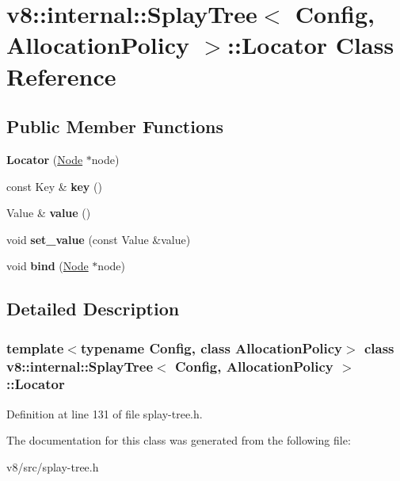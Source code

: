 \hypertarget{classv8_1_1internal_1_1SplayTree_1_1Locator}{}\section{v8\+:\+:internal\+:\+:Splay\+Tree$<$ Config, Allocation\+Policy $>$\+:\+:Locator Class Reference}
\label{classv8_1_1internal_1_1SplayTree_1_1Locator}
\subsection*{Public Member Functions}
\begin{DoxyCompactItemize}
\item 
\mbox{\label{classv8_1_1internal_1_1SplayTree_1_1Locator_aa7837aefae2009d7ce2dad2e1b3f0a85}} 
{\bfseries Locator} (\mbox{\hyperlink{classv8_1_1internal_1_1SplayTree_1_1Node}{Node}} $\ast$node)
\item 
\mbox{\label{classv8_1_1internal_1_1SplayTree_1_1Locator_a10b59ee20577e927c5c21c2a71bb390b}} 
const Key \& {\bfseries key} ()
\item 
\mbox{\label{classv8_1_1internal_1_1SplayTree_1_1Locator_aae7969e5d6e2255633dd892ffba2b1b3}} 
Value \& {\bfseries value} ()
\item 
\mbox{\label{classv8_1_1internal_1_1SplayTree_1_1Locator_a1714f075393a0fc1d5820f59556d744e}} 
void {\bfseries set\+\_\+value} (const Value \&value)
\item 
\mbox{\label{classv8_1_1internal_1_1SplayTree_1_1Locator_a93ead22bb615a5c24d6fd8c8bc9afd29}} 
void {\bfseries bind} (\mbox{\hyperlink{classv8_1_1internal_1_1SplayTree_1_1Node}{Node}} $\ast$node)
\end{DoxyCompactItemize}


\subsection{Detailed Description}
\subsubsection*{template$<$typename Config, class Allocation\+Policy$>$\newline
class v8\+::internal\+::\+Splay\+Tree$<$ Config, Allocation\+Policy $>$\+::\+Locator}



Definition at line 131 of file splay-\/tree.\+h.



The documentation for this class was generated from the following file\+:\begin{DoxyCompactItemize}
\item 
v8/src/splay-\/tree.\+h\end{DoxyCompactItemize}

